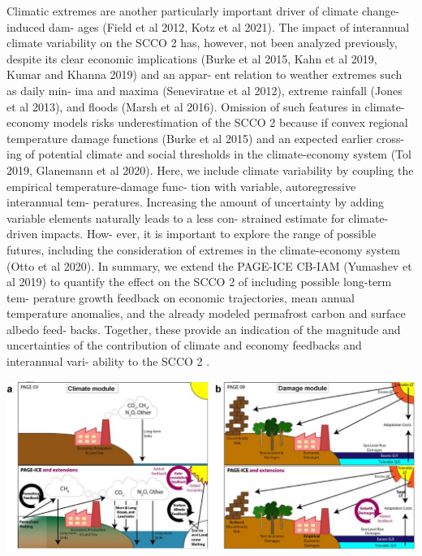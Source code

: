 \documentclass[
]{book}
\begin{document}
Climatic extremes are another particularly
important driver of climate change-induced dam-
ages (Field et al 2012, Kotz et al 2021). The impact
of interannual climate variability on the SCCO 2 has,
however, not been analyzed previously, despite its
clear economic implications (Burke et al 2015, Kahn
et al 2019, Kumar and Khanna 2019) and an appar-
ent relation to weather extremes such as daily min-
ima and maxima (Seneviratne et al 2012), extreme
rainfall (Jones et al 2013), and floods (Marsh et al
2016). Omission of such features in climate-economy
models risks underestimation of the SCCO 2 because
if convex regional temperature damage functions
(Burke et al 2015) and an expected earlier cross-
ing of potential climate and social thresholds in
the climate-economy system (Tol 2019, Glanemann
et al 2020). Here, we include climate variability by
coupling the empirical temperature-damage func-
tion with variable, autoregressive interannual tem-
peratures. Increasing the amount of uncertainty by
adding variable elements naturally leads to a less con-
strained estimate for climate-driven impacts. How-
ever, it is important to explore the range of possible
futures, including the consideration of extremes in
the climate-economy system (Otto et al 2020).
In summary, we extend the PAGE-ICE CB-IAM
(Yumashev et al 2019) to quantify the effect on
the SCCO 2 of including possible long-term tem-
perature growth feedback on economic trajectories,
mean annual temperature anomalies, and the already
modeled permafrost carbon and surface albedo feed-
backs. Together, these provide an indication of the
magnitude and uncertainties of the contribution of
climate and economy feedbacks and interannual vari-
ability to the SCCO 2 .

\includegraphics{fig/PAGE-ICE-extensions.jpg}
\end{document}
